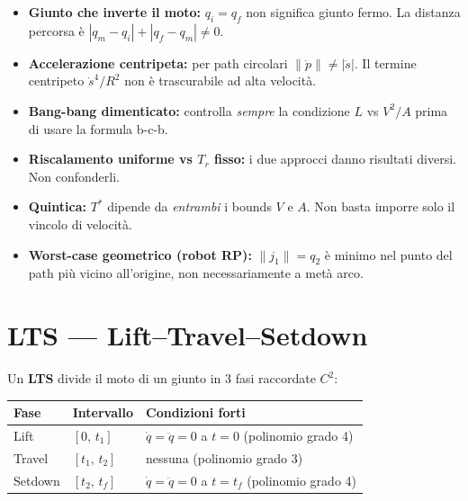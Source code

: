 \documentclass[10pt,a4paper]{article}
\newcommand{\dt}{\dot{s}}
\newcommand{\ddt}{\ddot{s}}
\begin{document}
\begin{redbox}
\begin{itemize}
  \item \textbf{Giunto che inverte il moto:} $q_i = q_f$ non significa giunto fermo.
        La distanza percorsa \`e $|q_m - q_i| + |q_f - q_m| \neq 0$.

  \item \textbf{Accelerazione centripeta:} per path circolari $\|\ddot{p}\| \neq |\ddt|$.
        Il termine centripeto $\dt^4/R^2$ non \`e trascurabile ad alta velocit\`a.

  \item \textbf{Bang-bang dimenticato:} controlla \textit{sempre} la condizione $L$ vs $V^2/A$
        prima di usare la formula b-c-b.

  \item \textbf{Riscalamento uniforme vs $T_r$ fisso:} i due approcci danno risultati diversi.
        Non confonderli.

  \item \textbf{Quintica:} $T^*$ dipende da \textit{entrambi} i bounds $V$ e $A$.
        Non basta imporre solo il vincolo di velocit\`a.

  \item \textbf{Worst-case geometrico (robot RP):} $\|j_1\| = q_2$ \`e minimo nel punto
        del path pi\`u vicino all'origine, non necessariamente a met\`a arco.
\end{itemize}
\end{redbox}

\newpage
\section{LTS --- Lift--Travel--Setdown}

Un \textbf{LTS} divide il moto di un giunto in 3 fasi raccordate $C^2$:

\begin{center}
\renewcommand{\arraystretch}{1.3}
\begin{tabular}{@{}llp{7cm}@{}}
\toprule
\textbf{Fase} & \textbf{Intervallo} & \textbf{Condizioni forti}\\
\midrule
Lift     & $[0,\, t_1]$      & $\dot{q}=\ddot{q}=0$ a $t=0$ \quad (polinomio grado 4)\\
Travel   & $[t_1,\, t_2]$    & nessuna \quad (polinomio grado 3)\\
Setdown  & $[t_2,\, t_f]$    & $\dot{q}=\ddot{q}=0$ a $t=t_f$ \quad (polinomio grado 4)\\
\bottomrule
\end{tabular}
\end{center}
\end{document}
